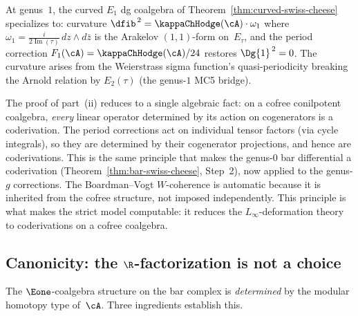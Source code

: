 \begin{corollary}
\label{cor:genus1-curved-swiss-cheese}%
\label{cor:mc5-genus-one-bridge}%
At genus~$1$, the curved $E_1$ dg coalgebra of
Theorem~\textup{\ref{thm:curved-swiss-cheese}} specializes to:
curvature $\dfib^{\,2} = \kappaChHodge(\cA) \cdot \omega_1$ where
$\omega_1 = \frac{i}{2\operatorname{Im}(\tau)}\,dz \wedge d\bar{z}$
is the Arakelov $(1,1)$-form on~$E_\tau$, and the period correction
$F_1(\cA) = \kappaChHodge(\cA)/24$ restores $\Dg{1}^{\,2} = 0$.
The curvature arises from the Weierstrass sigma function's
quasi-periodicity breaking the Arnold relation by $E_2(\tau)$
\textup{(}the genus-$1$ MC5 bridge\textup{)}.
\end{corollary}

\begin{remark}
The proof of part~(ii) reduces to a single algebraic fact:
on a cofree conilpotent coalgebra, \emph{every} linear operator
determined by its action on cogenerators is a coderivation.
The period corrections act on individual tensor factors (via
cycle integrals), so they are determined by their cogenerator
projections, and hence are coderivations. This is the same
principle that makes the genus-$0$ bar differential a
coderivation (Theorem~\ref{thm:bar-swiss-cheese}, Step~2), now
applied to the genus-$g$ corrections. The Boardman--Vogt
$W$-coherence is automatic because it is inherited from the
cofree structure, not imposed independently.
This principle is what makes the strict model computable: it reduces
the $L_\infty$-deformation theory to coderivations on a cofree
coalgebra.
\end{remark}

\subsection{Canonicity: the $\R$-factorization is not a choice}
\label{subsec:R-canonicity}

The $\Eone$-coalgebra structure on the bar complex is
\emph{determined} by the modular homotopy type of~$\cA$. Three
ingredients establish this.

